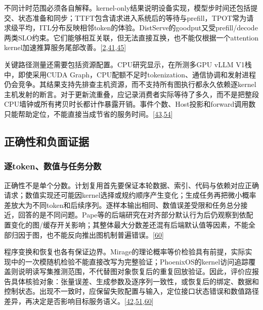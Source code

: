 \documentclass[
  UTF8,
  zihao=5]{ctexart}
\begin{document}
不同计时范围必须各自解释。kernel-only结果说明设备实现，模型步时间还包括提交、状态准备和同步；TTFT包含请求进入系统后的等待与prefill，TPOT常为请求级平均，ITL分布反映相邻token的体验。DistServe的goodput又受prefill/decode两类SLO约束。它们能够相互关联，但无法直接互换，也不能仅根据一个attention
kernel加速推算服务尾部改善。{[}\protect\hyperlink{ref-ye2025flashinfer}{2},\protect\hyperlink{ref-kamath2025pod}{41},\protect\hyperlink{ref-zhong2024distserve}{45}{]}

关键路径测量还需要包括资源配置。CPU研究显示，在所测多GPU vLLM
V1栈中，即使采用CUDA
Graph，CPU配额不足时tokenization、通信协调和发射进程仍会竞争。其结果支持先排查主机资源，而不支持所有图执行都永久依赖逐kernel主机发射的断言。对于更新流重叠，应记录消费者实际等待了多久，而不是把整段CPU墙钟或所有拷贝时长都计作暴露开销。事件个数、Host投影和forward调用数只能帮助定位，不能直接当成节省的服务时间。{[}\protect\hyperlink{ref-chung2026cpu}{43},\protect\hyperlink{ref-cann910update}{54}{]}

\hypertarget{ux6b63ux786eux6027ux548cux8d1fux9762ux8bc1ux636e}{%
\subsection{正确性和负面证据}\label{ux6b63ux786eux6027ux548cux8d1fux9762ux8bc1ux636e}}

\hypertarget{ux9010tokenux6570ux503cux4e0eux4efbux52a1ux5206ux6570}{%
\subsubsection{逐token、数值与任务分数}\label{ux9010tokenux6570ux503cux4e0eux4efbux52a1ux5206ux6570}}

正确性不是单个分数。计划复用首先要保证本轮数据、索引、代码与依赖对应正确请求；数值实现还可能因kernel选择或规约顺序产生变化；生成任务再把微小概率差放大为不同token和后续序列。逐样本输出相同、数值误差受限和任务总分接近，回答的是不同问题。Pape等的后端研究在对齐部分默认行为后仍观察到依配置变化的图/缓存开关影响；其整体最大分数差还混有后端默认值等因素，不能全部归因于图，也不能反向推出图机制普遍错误。{[}\protect\hyperlink{ref-pape2026backend}{60}{]}

程序变换和恢复也各有保证边界。Mirage的理论概率等价检验具有前提，实际实现中的一次模随机检验不能直接改写为完整验证；PhoenixOS的kernel访问追踪覆盖则说明读写集推测范围，不代替图对象恢复后的重复回放验证。因此，评价应报告具体核验对象：张量误差、生成参数及逐序列一致性，或恢复后的绑定、数据和控制状态。出现不一致时，应保留失败配置与输入，定位接口状态错误和数值路径差异，再决定是否影响目标服务语义。{[}\protect\hyperlink{ref-wu2025mirage}{42},\protect\hyperlink{ref-wei2025phoenixos}{51},\protect\hyperlink{ref-pape2026backend}{60}{]}
\end{document}
